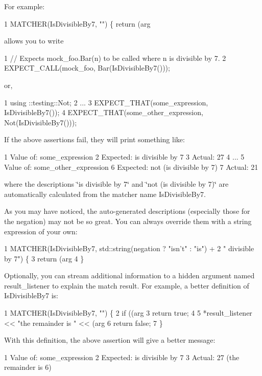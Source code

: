 For example\+: 
\begin{DoxyCode}
1 MATCHER(IsDivisibleBy7, "") \{ return (arg %
\end{DoxyCode}
 allows you to write 
\begin{DoxyCode}
1 // Expects mock\_foo.Bar(n) to be called where n is divisible by 7.
2 EXPECT\_CALL(mock\_foo, Bar(IsDivisibleBy7()));
\end{DoxyCode}
 or, 
\begin{DoxyCode}
1 using ::testing::Not;
2 ...
3   EXPECT\_THAT(some\_expression, IsDivisibleBy7());
4   EXPECT\_THAT(some\_other\_expression, Not(IsDivisibleBy7()));
\end{DoxyCode}
 If the above assertions fail, they will print something like\+: 
\begin{DoxyCode}
1   Value of: some\_expression
2   Expected: is divisible by 7
3     Actual: 27
4 ...
5   Value of: some\_other\_expression
6   Expected: not (is divisible by 7)
7     Actual: 21
\end{DoxyCode}
 where the descriptions {\ttfamily \char`\"{}is divisible by 7\char`\"{}} and {\ttfamily \char`\"{}not (is divisible
by 7)\char`\"{}} are automatically calculated from the matcher name {\ttfamily Is\+Divisible\+By7}.

As you may have noticed, the auto-\/generated descriptions (especially those for the negation) may not be so great. You can always override them with a string expression of your own\+: 
\begin{DoxyCode}
1 MATCHER(IsDivisibleBy7, std::string(negation ? "isn't" : "is") +
2                         " divisible by 7") \{
3   return (arg %
4 \}
\end{DoxyCode}


Optionally, you can stream additional information to a hidden argument named {\ttfamily result\+\_\+listener} to explain the match result. For example, a better definition of {\ttfamily Is\+Divisible\+By7} is\+: 
\begin{DoxyCode}
1 MATCHER(IsDivisibleBy7, "") \{
2   if ((arg %
3     return true;
4 
5   *result\_listener << "the remainder is " << (arg %
6   return false;
7 \}
\end{DoxyCode}


With this definition, the above assertion will give a better message\+: 
\begin{DoxyCode}
1 Value of: some\_expression
2 Expected: is divisible by 7
3   Actual: 27 (the remainder is 6)
\end{DoxyCode}


